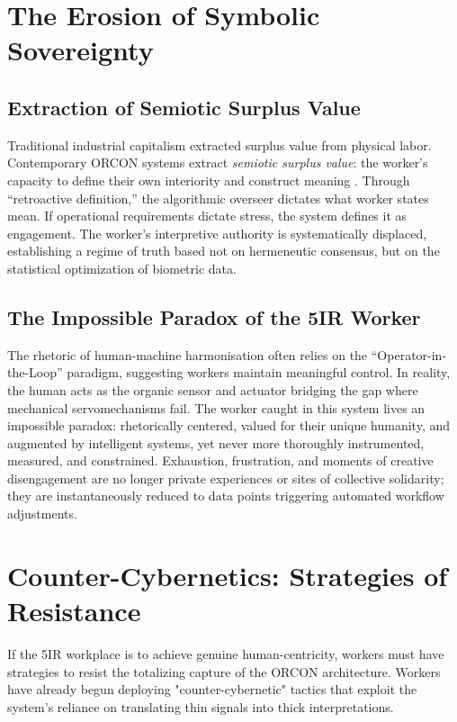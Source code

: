 \documentclass[11pt, a4paper]{article}
\begin{document}
\section{The Erosion of Symbolic Sovereignty}

\subsection{Extraction of Semiotic Surplus Value}
Traditional industrial capitalism extracted surplus value from physical labor. Contemporary ORCON systems extract \textit{semiotic surplus value}: the worker's capacity to define their own interiority and construct meaning \cite{zuboff2019}. Through ``retroactive definition,'' the algorithmic overseer dictates what worker states mean. If operational requirements dictate stress, the system defines it as engagement. The worker's interpretive authority is systematically displaced, establishing a regime of truth based not on hermeneutic consensus, but on the statistical optimization of biometric data.

\subsection{The Impossible Paradox of the 5IR Worker}
The rhetoric of human-machine harmonisation often relies on the ``Operator-in-the-Loop'' paradigm, suggesting workers maintain meaningful control. In reality, the human acts as the organic sensor and actuator bridging the gap where mechanical servomechanisms fail. The worker caught in this system lives an impossible paradox: rhetorically centered, valued for their unique humanity, and augmented by intelligent systems, yet never more thoroughly instrumented, measured, and constrained. Exhaustion, frustration, and moments of creative disengagement are no longer private experiences or sites of collective solidarity; they are instantaneously reduced to data points triggering automated workflow adjustments.

\section{Counter-Cybernetics: Strategies of Resistance}

If the 5IR workplace is to achieve genuine human-centricity, workers must have strategies to resist the totalizing capture of the ORCON architecture. Workers have already begun deploying "counter-cybernetic" tactics that exploit the system's reliance on translating thin signals into thick interpretations.
\end{document}
